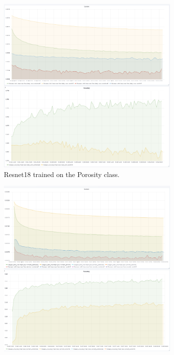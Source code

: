 \begin{figure}
\centering
\begin{subfigure}{.6\textwidth}
  \centering
  \includegraphics[width=1\linewidth]{figures/04-Init_poro_acc.PNG}
  \caption{Resnet18 trained on the Porosity class.}
  \label{fig:resinit_poro}
\end{subfigure}%
\begin{subfigure}{.6\textwidth}
  \centering
  \includegraphics[width=1\linewidth]{figures/04-Init_dunham_acc.PNG}

\end{subfigure}
\end{figure}
